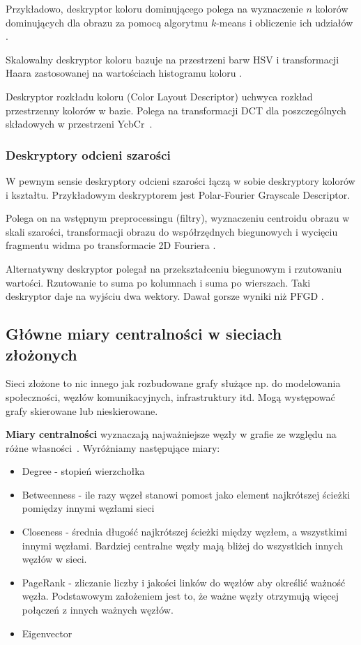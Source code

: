 \documentclass[wi]{zut}
\begin{document}
Przykładowo, deskryptor koloru dominującego polega na wyznaczenie $n$ kolorów dominujących dla obrazu za pomocą algorytmu $k$-means i obliczenie ich udziałów \cite{Frejlichowski2020_6}.

Skalowalny deskryptor koloru bazuje na przestrzeni barw HSV i transformacji Haara zastosowanej na wartościach histogramu koloru \cite{Frejlichowski2020_6}.

Deskryptor rozkładu koloru (Color Layout Descriptor) uchwyca rozkład przestrzenny kolorów w bazie. Polega na transformacji DCT dla poszczególnych składowych w przestrzeni YcbCr~\cite{Frejlichowski2020_6}.

\subsubsection{Deskryptory odcieni szarości}

W pewnym sensie deskryptory odcieni szarości łączą w sobie deskryptory kolorów i kształtu. Przykładowym deskryptorem jest Polar-Fourier Grayscale Descriptor.

Polega on na wstępnym preprocessingu (filtry), wyznaczeniu centroidu obrazu w skali szarości, transformacji obrazu do współrzędnych biegunowych i wycięciu fragmentu widma po transformacie 2D Fouriera \cite{frejlichowski2015application}.

Alternatywny deskryptor polegał na przekształceniu biegunowym i rzutowaniu wartości. Rzutowanie to suma po kolumnach i suma po wierszach. Taki deskryptor daje na wyjściu dwa wektory. Dawał gorsze wyniki niż PFGD \cite{Frejlichowski2020_5}.


\subsection{Główne miary centralności w sieciach złożonych}

Sieci złożone to nic innego jak rozbudowane grafy służące np. do modelowania społeczności, węzłów komunikacyjnych, infrastruktury itd. Mogą występować grafy skierowane lub nieskierowane.

\textbf{Miary centralności} wyznaczają najważniejsze węzły w grafie ze względu na różne własności~\cite{Jankowski2020}. Wyróżniamy następujące miary:

\begin{itemize}
    \item Degree - stopień wierzchołka
    \item Betweenness - ile razy węzeł stanowi pomost jako element najkrótszej ścieżki pomiędzy innymi węzłami sieci
    \item Closeness - średnia długość najkrótszej ścieżki między węzłem, a wszystkimi innymi węzłami. Bardziej centralne węzły mają bliżej do wszystkich innych węzłów w sieci.
    \item PageRank - zliczanie liczby i jakości linków do węzłów aby określić ważność węzła. Podstawowym założeniem jest to, że ważne węzły otrzymują więcej połączeń z innych ważnych węzłów.
    \item Eigenvector
\end{itemize}
\end{document}
